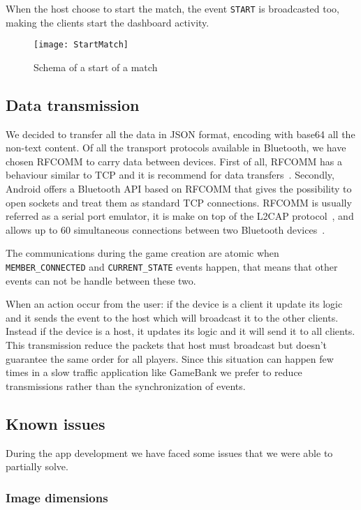 When the host choose to start the match, the event \texttt{START} is 
broadcasted too, making the clients start the dashboard activity.

\begin{figure}[t]
 \centering
 \texttt{[image: StartMatch]}
 \caption{Schema of a start of a match}
 \label{fig:gbStartMatch}
\end{figure}

\subsection{Data transmission}

We decided to transfer all the data in JSON format, encoding with base64 all the
non-text content.
Of all the transport protocols available in Bluetooth, we have chosen RFCOMM to 
carry data between devices. First of all, RFCOMM has a behaviour similar to TCP 
and it is recommend for data transfers~\cite{bisdikian01}. Secondly, Android 
offers a Bluetooth API based on RFCOMM that gives the possibility to open 
sockets and treat them as standard TCP connections.
RFCOMM is usually referred as a serial port emulator, it is make on top of 
the L2CAP protocol~\cite{bisdikian01}, and allows up to 60 simultaneous 
connections between two Bluetooth devices~\cite{aneesh12}.

The communications during the game creation are atomic when 
\texttt{MEMBER\_CONNECTED} and \texttt{CURRENT\_STATE} events happen, that 
means that other events can not be handle between these two.

When an action occur from the user: if the device is a client it update its logic 
and it sends the event to the host which will broadcast it to the other clients. 
Instead if the device is a host, it updates its logic and it will send it to all 
clients. This transmission reduce the packets that host must broadcast but doesn't 
guarantee the same order for all players. 
Since this situation can happen few times in a slow traffic application like 
GameBank we prefer to reduce transmissions rather than the synchronization of events.

\subsection{Known issues}

During the app development we have faced some issues that we were able to 
partially solve.

\subsubsection{Image dimensions}

